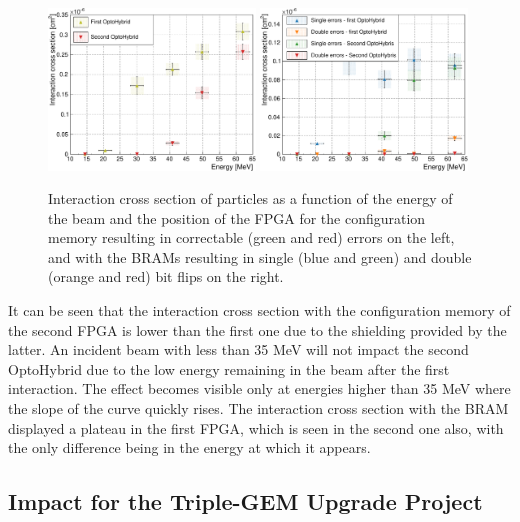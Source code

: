       \begin{figure}[h!]
        \centering
        \includegraphics[width=0.49\textwidth]{img/plots/cE_SEU_Comp-crop}
        \includegraphics[width=0.49\textwidth]{img/plots/cE_BRAM_Comp-crop}
        \caption{Interaction cross section of particles as a function of the energy of the beam and the position of the FPGA for the configuration memory resulting in correctable (green and red) errors on the left, and with the BRAMs resulting in single (blue and green) and double (orange and red) bit flips on the right.}
        \label{fig:II-6-data-seu-comp}
      \end{figure}

      It can be seen that the interaction cross section with the configuration memory of the second FPGA is lower than the first one due to the shielding provided by the latter. An incident beam with less than 35 MeV will not impact the second OptoHybrid due to the low energy remaining in the beam after the first interaction. The effect becomes visible only at energies higher than 35 MeV where the slope of the curve quickly rises. The interaction cross section with the BRAM displayed a plateau in the first FPGA, which is seen in the second one also, with the only difference being in the energy at which it appears.

    \subsection{Impact for the Triple-GEM Upgrade Project}


